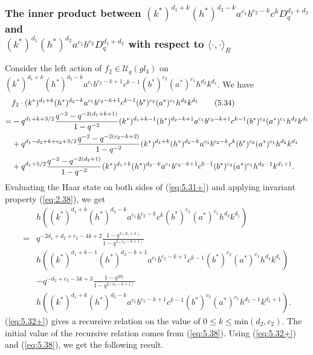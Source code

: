 \documentclass[table,a4paper,reqno]{amsart}
\numberwithin{equation}{section}
\theoremstyle{definition}
\begin{document}
\subsubsection{The inner product between $(k^*)^{d_1+k}(h^*)^{d_2-k}a^{c_1}b^{c_2-k}c^kD_q^{d_1+d_2}$ and\\ $(k^*)^{d_1}(h^*)^{d_2}a^{c_1}b^{c_2}D_q^{d_1+d_2}$ with respect to $\langle \cdot,\cdot\rangle_R$}
Consider the left action of $f_2\in\mathcal{U}_q(gl_3)$ on $(k^*)^{d_1+k}(h^*)^{d_2-k}a^{c_1}b^{c_2-k+1}c^{k-1}(b^*)^{c_2}(a^*)^{c_1}h^{d_2}k^{d_1}$. We have
\begin{align}\label{eq:5.31+}\stepcounter{equation}
        &f_2\cdot (k^*)^{d_1+k}(h^*)^{d_2-k}a^{c_1}b^{c_2-k+1}c^{k-1}(b^*)^{c_2}(a^*)^{c_1}h^{d_2}k^{d_1}\tag{5.34}\\
        =&-q^{d_1+k+3/2}\frac{q^{-2}-q^{-2(d_1+k+1)}}{1-q^{-2}}(k^*)^{d_1+k-1}(h^*)^{d_2-k+1}a^{c_1}b^{c_2-k+1}c^{k-1}(b^*)^{c_2}(a^*)^{c_1}h^{d_2}k^{d_1}\notag\\
        &+q^{d_1-d_2+k+c_2+3/2}\frac{q^{-2}-q^{-2(c_2-k+2)}}{1-q^{-2}}(k^*)^{d_1+k}(h^*)^{d_2-k}a^{c_1}b^{c_2-k}c^{k}(b^*)^{c_2}(a^*)^{c_1}h^{d_2}k^{d_1}\notag\\
        &+q^{d_1+5/2}\frac{q^{-2}-q^{-2(d_2+1)}}{1-q^{-2}}(k^*)^{d_1+k}(h^*)^{d_2-k}a^{c_1}b^{c_2-k+1}c^{k-1}(b^*)^{c_2}(a^*)^{c_1}h^{d_2-1}k^{d_1+1}.\notag
\end{align}
Evaluating the Haar state on both sides of (\ref{eq:5.31+}) and applying invariant property (\ref{eq:2.38}), we get
\begin{equation}\label{eq:5.32+}
    \begin{split}
        &h((k^*)^{d_1+k}(h^*)^{d_2-k}a^{c_1}b^{c_2-k}c^{k}(b^*)^{c_2}(a^*)^{c_1}h^{d_2}k^{d_1})\\
        =&q^{-2d_1+d_2+c_2-4k+2}\frac{1-q^{2(d_1+k)}}{1-q^{2(c_2-k+1)}}\\
        &h((k^*)^{d_1+k-1}(h^*)^{d_2-k+1}a^{c_1}b^{c_2-k+1}c^{k-1}(b^*)^{c_2}(a^*)^{c_1}h^{d_2}k^{d_1})\\
        &-q^{-d_2+c_2-3k+3}\frac{1-q^{2d_2}}{1-q^{2(c_2-k+1)}}\\
        &h((k^*)^{d_1+k}(h^*)^{d_2-k}a^{c_1}b^{c_2-k+1}c^{k-1}(b^*)^{c_2}(a^*)^{c_1}h^{d_2-1}k^{d_1+1}).
    \end{split}
\end{equation}
(\ref{eq:5.32+}) gives a recursive relation on the value of $0\le k\le \text{min}(d_2,c_2)$. The initial value of the recursive relation comes from (\ref{eq:5.38}). Using (\ref{eq:5.32+}) and (\ref{eq:5.38}), we get the following result.
\end{document}
